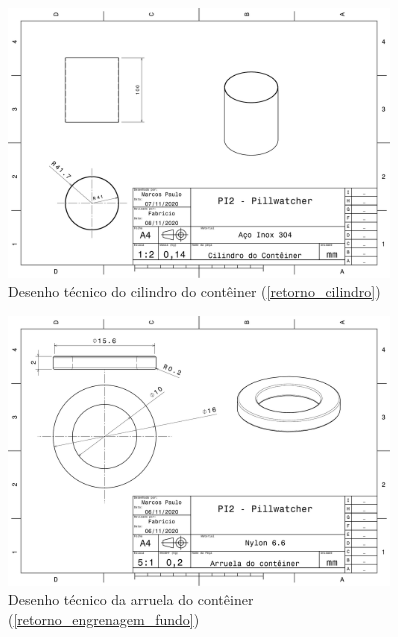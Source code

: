 \begin{apendicesenv}
\begin{figure}[H]
    \centering
    \includegraphics[width=0.9\textwidth]{figuras/estrutura/Desenhos/Cilindro.pdf}
    \caption{Desenho técnico do cilindro do contêiner (\ref{retorno_cilindro})}
    \label{fig:cilindro}
\end{figure}

\begin{figure}[H]
    \centering
    \includegraphics[width=0.9\textwidth]{figuras/estrutura/Desenhos/Arruela_conteiner.pdf}
    \caption{Desenho técnico da arruela do contêiner (\ref{retorno_engrenagem_fundo})}
    \label{fig:arruela}
\end{figure}


\end{apendicesenv}
